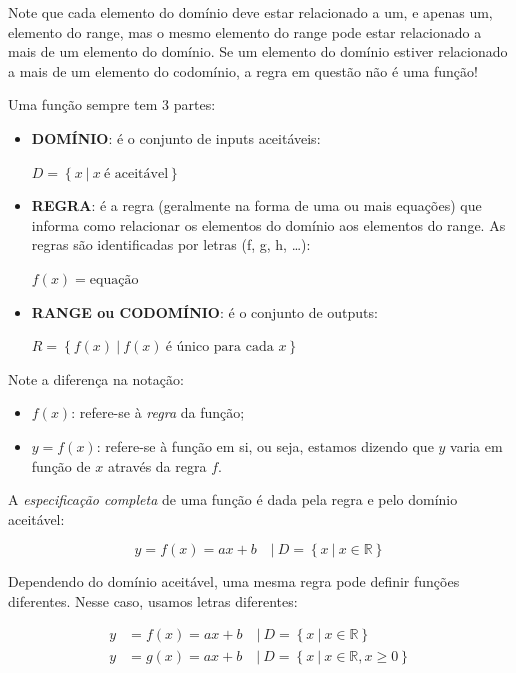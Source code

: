 \documentclass[pdftex, brazil, 12pt, twoside]{article}
\begin{document}
Note que cada elemento do domínio deve estar relacionado a um, e apenas um,
elemento do range, mas o mesmo elemento do range pode estar relacionado a
mais de um elemento do domínio. Se um elemento do domínio estiver relacionado
a mais de um elemento do codomínio, a regra em questão não é uma função!

Uma função sempre tem 3 partes:

\begin{itemize}
\item \textbf{DOMÍNIO}: é o conjunto de inputs aceitáveis:

  $D = \left\{x\ |\ x\ \text{é aceitável}\right\}$
\item \textbf{REGRA}: é a regra (geralmente na forma de uma ou mais equações)
  que informa como relacionar os elementos do domínio aos elementos do range.
  As regras são identificadas por letras (f, g, h, \ldots):

  $f(x) = \text{equação}$
\item \textbf{RANGE ou CODOMÍNIO}: é o conjunto de outputs:

  $R = \left\{f(x)\ |\ f(x)\ \text{é único para cada }x\right\}$
\end{itemize}

Note a diferença na notação:

\begin{itemize}[noitemsep]
\item $f(x)$: refere-se à \emph{regra} da função;
\item $y = f(x)$: refere-se à função em si, ou seja, estamos dizendo que $y$ varia
  em função de $x$ através da regra $f$.
\end{itemize}

A \emph{especificação completa} de uma função é dada pela regra e pelo domínio
aceitável:

\begin{equation}
    y = f(x) = ax + b \quad |\ D = \left\{x\ |\ x \in \mathbb{R}\right\}
\end{equation}

Dependendo do domínio aceitável, uma mesma regra pode definir funções diferentes.
Nesse caso, usamos letras diferentes:

\begin{equation}
  \begin{split}
    y & = f(x) = ax + b \quad |\ D = \left\{x\ |\ x \in \mathbb{R}\right\}\\
    y & = g(x) = ax + b \quad |\ D = \left\{x\ |\ x \in \mathbb{R}, x \ge 0\right\}
  \end{split}
\end{equation}
\end{document}
